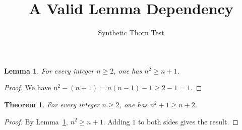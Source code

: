 \documentclass{article}
\newtheorem{lemma}{Lemma}
\newtheorem{theorem}{Theorem}
\begin{document}
\title{A Valid Lemma Dependency}
\author{Synthetic Thorn Test}
\maketitle

\begin{lemma}\label{lem:good-bound}
For every integer $n\ge2$, one has $n^2\ge n+1$.
\end{lemma}
\begin{proof}
We have $n^2-(n+1)=n(n-1)-1\ge2-1=1$.
\end{proof}

\begin{theorem}\label{thm:clean-dependency}
For every integer $n\ge2$, one has $n^2+1\ge n+2$.
\end{theorem}
\begin{proof}
By Lemma~\ref{lem:good-bound}, $n^2\ge n+1$. Adding $1$ to both sides gives the result.
\end{proof}
\end{document}
